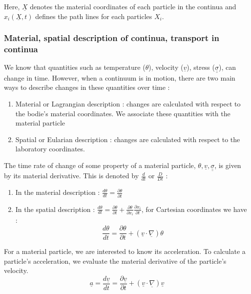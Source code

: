 \documentclass[../main.tex]{subfiles}
\begin{document}
Here, $\underline{X}$ denotes the material coordinates of each particle in the continua and $x_i(\underline{X},t)$ defines the path lines for each particles $X_i$.\\

\subsubsection{Material, spatial description of continua, transport in continua}
We know that quantities such as temperature ($\theta$), velocity ($\underline{v}$), stress ($\underline{\underline{\sigma}}$), can change in time. However, when a continuum is in motion, there are two main ways to describe changes in these quantities over time : \\
\begin{enumerate}
    \item Material or Lagrangian description : changes are calculated with respect to the bodie's material coordinates. We associate these quantities with the material particle\\
    \item Spatial or Eularian description : changes are calculated with respect to the laboratory coordinates.\\
\end{enumerate}

The time rate of change of some property of a material particle, $\theta, \underline{v}, \underline{\underline{\sigma}}$, is given by its material derivative. This is denoted by $\frac{d}{dt}$ or $\frac{D}{Dt}$ : \\
\begin{enumerate}
    \item In the material description : $\frac{d \theta}{dt} = \frac{\partial \theta}{\partial t}$\\
    \item In the spatial description : $\frac{d\theta}{dt} = \frac{\partial \theta}{\partial t} + \frac{\partial \theta}{\partial x_i} \frac{\partial x_i}{\partial t}$, for Cartesian coordinates we have :\begin{equation}
        \frac{d\theta}{dt} = \frac{\partial \theta}{\partial t} + (\underline{v} \cdot \underline{\nabla}) \theta
    \end{equation}
\end{enumerate}
For a material particle, we are interested to know its acceleration. To calculate a particle's acceleration, we evaluate the material derivative of the particle's velocity.\\
\begin{equation}
    \underline{a} = \frac{d \underline{v}}{dt} = \frac{\partial \underline{v}}{\partial t} + (\underline{v} \cdot \underline{\nabla}) \underline{v} 
\end{equation}
\end{document}
